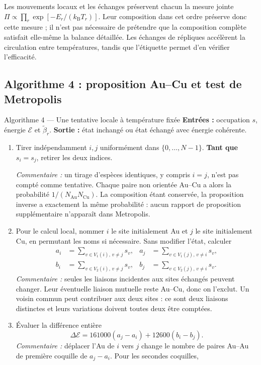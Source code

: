 \documentclass[10pt,a4paper]{article}
\newcommand{\Au}{\mathrm{Au}}
\newcommand{\Cu}{\mathrm{Cu}}
\newcommand{\kb}{k_{\mathrm B}}
\begin{document}
Les mouvements locaux et les échanges préservent chacun la mesure jointe
$\Pi\propto\prod_r\exp[-E_r/(\kb T_r)]$. Leur composition dans cet ordre
préserve donc cette mesure ; il n'est pas nécessaire de prétendre que la
composition complète satisfait elle-même la balance détaillée. Les échanges
de répliques accélèrent la circulation entre températures, tandis que
l'étiquette permet d'en vérifier l'efficacité.

\subsection{Algorithme 4 : proposition Au--Cu et test de Metropolis}
\begin{algocode}{Algorithme 4 --- Une tentative locale à température fixée}
\textbf{Entrées :} occupation $s$, énergie $\mathcal E$ et $\widetilde\beta_r$.
\textbf{Sortie :} état inchangé ou état échangé avec énergie cohérente.
\begin{enumerate}
\item Tirer indépendamment $i,j$ uniformément dans $\{0,\ldots,N-1\}$.
\textbf{Tant que} $s_i=s_j$, retirer les deux indices.
\par\textit{Commentaire :} un tirage d'espèces identiques, y compris $i=j$,
n'est pas compté comme tentative. Chaque paire non orientée Au--Cu a alors
la probabilité $1/(N_{\Au}N_{\Cu})$. La composition étant conservée,
la proposition inverse a exactement la même probabilité : aucun rapport
de proposition supplémentaire n'apparaît dans Metropolis.
\item Pour le calcul local, nommer $i$ le site initialement Au et $j$ le
site initialement Cu, en permutant les noms si nécessaire. Sans modifier
l'état, calculer
\[
\begin{aligned}
a_i&=\sum_{v\in V_1(i),\,v\ne j}s_v,&
a_j&=\sum_{v\in V_1(j),\,v\ne i}s_v,\\
b_i&=\sum_{v\in V_2(i),\,v\ne j}s_v,&
b_j&=\sum_{v\in V_2(j),\,v\ne i}s_v.
\end{aligned}
\]
\textit{Commentaire :} seules les liaisons incidentes aux sites échangés
peuvent changer. Leur éventuelle liaison mutuelle reste Au--Cu, donc on
l'exclut. Un voisin commun peut contribuer aux deux sites : ce sont deux
liaisons distinctes et leurs variations doivent toutes deux être comptées.
\item Évaluer la différence entière
\[
 \Delta\mathcal E=161000(a_j-a_i)+12600(b_i-b_j).
\]
\textit{Commentaire :} déplacer l'Au de $i$ vers $j$ change le nombre de
paires Au--Au de première coquille de $a_j-a_i$. Pour les secondes coquilles,

\end{enumerate}
\end{algocode}
\end{document}
